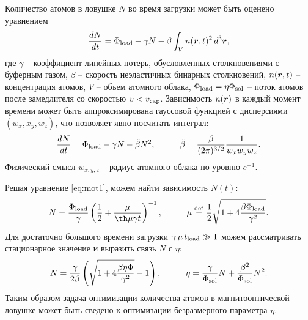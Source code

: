 
\startp
{}
Количество атомов в ловушке $N$ во время загрузки может быть оценено уравнением \cite{vlad}
\begin{equation}
	\frac{d N}{d t} = \Phi_{\textnormal{load}} - \gamma N - \beta \int_V n(\boldsymbol{r}, t)^2 \, d^3 \boldsymbol{r},
\end{equation}
где $\gamma$ -- коэффициент линейных потерь, обусловленных столкновениями с буферным газом, $\beta$ -- скорость неэластичных бинарных столкновений, $n(\boldsymbol{r}, t)$ -- концентрация атомов, $V$ -- объем атомного облака, $\Phi_{\textnormal{load}} = \eta \Phi_{\textnormal{sol}}$ -- поток атомов после замедлителя со скоростью $v < v_{\textnormal{cap}}$. Зависимость $n(\boldsymbol{r})$ в каждый момент времени может быть аппроксимирована гауссовой функцией с дисперсиями $(w_x, x_y, w_z)$, что позволяет явно посчитать интеграл:
\begin{equation}
	\frac{d N}{d t}  = \sub{\Phi}{load}  - \gamma N - \tilde{\beta} N^2,
	\hspace{10 mm} 
	\tilde{\beta} = \frac{\beta}{(2\pi)^{3/2}} \frac{1}{w_x w_y w_z}.
	\label{eq:mot1}
\end{equation}
Физический смысл $w_{x, y,z}$ -- радиус атомного облака по уровню $e^{-1}$.

Решая уравнение \eqref{eq:mot1}, можем найти зависимость $N(t)$:
\begin{equation}
	N = \frac{\sub{\Phi}{load}}{\gamma} \left(
		\frac{1}{2} + \frac{\mu}{\th \mu \gamma t }
	\right)^{-1}
	,
	\hspace{10 mm} 
	\mu \overset{\mathrm{def}}{=}  \frac{1}{2} \sqrt{1 + 4 \frac{\beta \sub{\Phi}{load}}{\gamma^2}}.
\end{equation}
Для достаточно большого времени загрузки $\gamma\, \mu\,  t_{\textnormal{load}} \gg 1$ можем рассматривать стационарное значение и выразить связь $N$ с $\eta$:
\begin{equation}
	N = \frac{\gamma}{2\beta}
	\left(\sqrt{1 + 4 \frac{\beta \eta \Phi}{\gamma^2}}-1\right),
	\hspace{10mm} 
	\eta = \frac{\gamma}{\sub{\Phi}{sol}} N + \frac{\beta^2}{\sub{\Phi}{sol}} N^2.
	\label{eq:etaN}
\end{equation}
Таким образом задача оптимизации количества атомов в магнитооптической ловушке может быть сведено к оптимизации безразмерного параметра $\eta$.  
